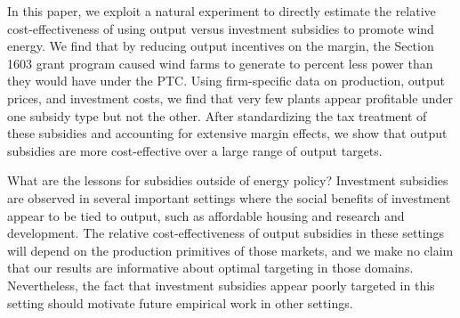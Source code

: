 \documentclass[12pt]{article}
\begin{document}
In this paper, we exploit a natural experiment to directly estimate the relative cost-effectiveness of using output versus investment subsidies to promote wind energy. We find that by reducing output incentives on the margin, the Section 1603 grant program caused wind farms to generate  \unskip to percent less power than they would have under the PTC. Using firm-specific data on production, output prices, and investment costs, we find that very few plants appear profitable under one subsidy type but not the other. After standardizing the tax treatment of these subsidies and accounting for extensive margin effects, we show that output subsidies are more cost-effective over a large range of output targets. 

What are the lessons for subsidies outside of energy policy? Investment subsidies are observed in several important settings where the social benefits of investment appear to be tied to output, such as affordable housing and research and development. The relative cost-effectiveness of output subsidies in these settings will depend on the production primitives of those markets, and we make no claim that our results are informative about optimal targeting in those domains. Nevertheless, the fact that investment subsidies appear poorly targeted in this setting should motivate future empirical work in other settings.

\pagebreak
%


\end{document}
